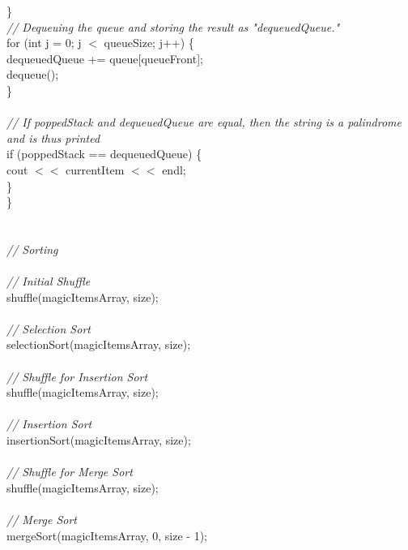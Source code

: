 \documentclass{article}
\begin{document}
\begin {linenumbers}
{        \indent \indent \}\\
        \textit{\indent \indent // Dequeuing the queue and storing the result as "dequeuedQueue."\\}
        \indent \indent for (int j = 0; j $<$ queueSize; j++) \{\\
            \indent \indent \indent dequeuedQueue += queue[queueFront];\\
            \indent \indent \indent dequeue();\\
        \indent \indent \}\\
\\
        \textit{\indent \indent // If poppedStack and dequeuedQueue are equal, then the string is a palindrome and is thus printed\\}
        \indent \indent if (poppedStack == dequeuedQueue) \{\\
            \indent \indent \indent cout $<<$ currentItem $<<$ endl;\\
        \indent \indent \}\\
    \indent \}\\
\\
\pagebreak
\\
    \textit{\indent // Sorting\\
\\
    \indent // Initial Shuffle\\}
    \indent shuffle(magicItemsArray, size);\\
\\
    \textit{\indent // Selection Sort\\}
    \indent selectionSort(magicItemsArray, size);\\
\\
    \textit{\indent // Shuffle for Insertion Sort\\}
    \indent shuffle(magicItemsArray, size);\\
\\
    \textit{\indent // Insertion Sort\\}
    \indent insertionSort(magicItemsArray, size);\\
\\
    \textit{\indent // Shuffle for Merge Sort\\}
    \indent shuffle(magicItemsArray, size);\\
\\
    \textit{\indent // Merge Sort\\}
    \indent mergeSort(magicItemsArray, 0, size - 1);\\
}
\end{linenumbers}
\end{document}
